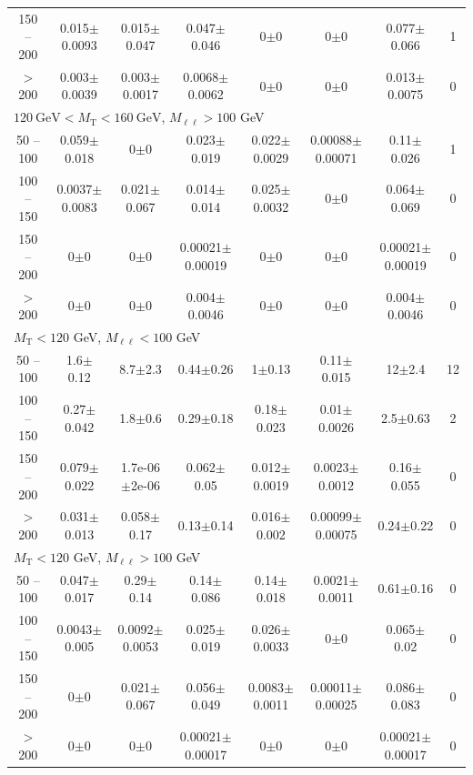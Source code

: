 \begin{landscape}
\begin{table}
\begin{center}
\begin{tabular}{| c | c c c c c c c | }
150 -- 200&0.015$\pm$0.0093&0.015$\pm$0.047&0.047$\pm$0.046&0$\pm$0&0$\pm$0&0.077$\pm$0.066&1\\
$>$ 200&0.003$\pm$0.0039&0.003$\pm$0.0017&0.0068$\pm$0.0062&0$\pm$0&0$\pm$0&0.013$\pm$0.0075&0\\
\hline\hline
\multicolumn{8}{l}{$120~\mathrm{GeV} < M_{\text{T}} < 160~\mathrm{GeV}$, $M_{\ell\ell} > 100$ GeV}\\\hline\hline
50 -- 100&0.059$\pm$0.018&0$\pm$0&0.023$\pm$0.019&0.022$\pm$0.0029&0.00088$\pm$0.00071&0.11$\pm$0.026&1\\
100 -- 150&0.0037$\pm$0.0083&0.021$\pm$0.067&0.014$\pm$0.014&0.025$\pm$0.0032&0$\pm$0&0.064$\pm$0.069&0\\
150 -- 200&0$\pm$0&0$\pm$0&0.00021$\pm$0.00019&0$\pm$0&0$\pm$0&0.00021$\pm$0.00019&0\\
$>$ 200&0$\pm$0&0$\pm$0&0.004$\pm$0.0046&0$\pm$0&0$\pm$0&0.004$\pm$0.0046&0\\
\hline\hline
\multicolumn{8}{l}{$M_{\text{T}} < 120$ GeV, $M_{\ell\ell} < 100$ GeV}\\\hline\hline
50 -- 100&1.6$\pm$0.12&8.7$\pm$2.3&0.44$\pm$0.26&1$\pm$0.13&0.11$\pm$0.015&12$\pm$2.4&12\\
100 -- 150&0.27$\pm$0.042&1.8$\pm$0.6&0.29$\pm$0.18&0.18$\pm$0.023&0.01$\pm$0.0026&2.5$\pm$0.63&2\\
150 -- 200&0.079$\pm$0.022&1.7e-06$\pm$2e-06&0.062$\pm$0.05&0.012$\pm$0.0019&0.0023$\pm$0.0012&0.16$\pm$0.055&0\\
$>$ 200&0.031$\pm$0.013&0.058$\pm$0.17&0.13$\pm$0.14&0.016$\pm$0.002&0.00099$\pm$0.00075&0.24$\pm$0.22&0\\
\hline\hline
\multicolumn{8}{l}{$M_{\text{T}} < 120$ GeV, $M_{\ell\ell} > 100$ GeV}\\\hline\hline
50 -- 100&0.047$\pm$0.017&0.29$\pm$0.14&0.14$\pm$0.086&0.14$\pm$0.018&0.0021$\pm$0.0011&0.61$\pm$0.16&0\\
100 -- 150&0.0043$\pm$0.005&0.0092$\pm$0.0053&0.025$\pm$0.019&0.026$\pm$0.0033&0$\pm$0&0.065$\pm$0.02&0\\
150 -- 200&0$\pm$0&0.021$\pm$0.067&0.056$\pm$0.049&0.0083$\pm$0.0011&0.00011$\pm$0.00025&0.086$\pm$0.083&0\\
$>$ 200&0$\pm$0&0$\pm$0&0.00021$\pm$0.00017&0$\pm$0&0$\pm$0&0.00021$\pm$0.00017&0\\
\hline\hline
\end{tabular}
\end{center}
\end{table}

\end{landscape}
